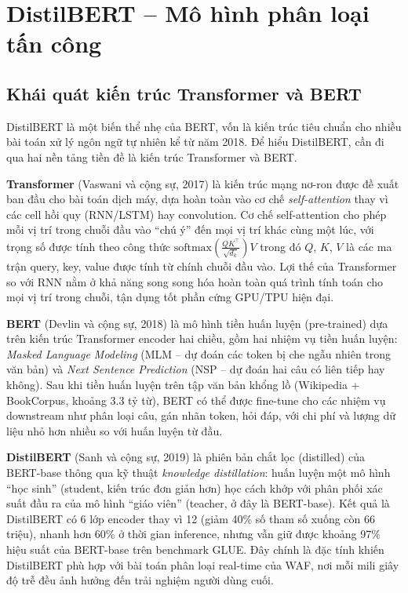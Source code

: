 \documentclass[../DoAn.tex]{subfiles}
\begin{document}
\section{DistilBERT -- Mô hình phân loại tấn công}
\label{section:3.3}

\subsection{Khái quát kiến trúc Transformer và BERT}
\label{subsection:3.3.1}

DistilBERT là một biến thể nhẹ của BERT, vốn là kiến trúc tiêu chuẩn cho
nhiều bài toán xử lý ngôn ngữ tự nhiên kể từ năm 2018. Để hiểu DistilBERT,
cần đi qua hai nền tảng tiền đề là kiến trúc Transformer và BERT.

\textbf{Transformer} (Vaswani và cộng sự, 2017) là kiến trúc mạng nơ-ron
được đề xuất ban đầu cho bài toán dịch máy, dựa hoàn toàn vào cơ chế
\textit{self-attention} thay vì các cell hồi quy (RNN/LSTM) hay convolution.
Cơ chế self-attention cho phép mỗi vị trí trong chuỗi đầu vào ``chú ý'' đến
mọi vị trí khác cùng một lúc, với trọng số được tính theo công thức
\(\text{softmax}\!\left(\frac{QK^\top}{\sqrt{d_k}}\right)V\) trong đó \(Q\),
\(K\), \(V\) là các ma trận query, key, value được tính từ chính chuỗi đầu
vào. Lợi thế của Transformer so với RNN nằm ở khả năng song song hóa hoàn
toàn quá trình tính toán cho mọi vị trí trong chuỗi, tận dụng tốt phần cứng
GPU/TPU hiện đại.

\textbf{BERT} (Devlin và cộng sự, 2018) là mô hình tiền huấn luyện
(pre-trained) dựa trên kiến trúc Transformer encoder hai chiều, gồm hai
nhiệm vụ tiền huấn luyện: \textit{Masked Language Modeling} (MLM -- dự đoán
các token bị che ngẫu nhiên trong văn bản) và \textit{Next Sentence
Prediction} (NSP -- dự đoán hai câu có liên tiếp hay không). Sau khi tiền
huấn luyện trên tập văn bản khổng lồ (Wikipedia + BookCorpus, khoảng 3.3 tỷ
từ), BERT có thể được fine-tune cho các nhiệm vụ downstream như phân loại
câu, gán nhãn token, hỏi đáp, với chi phí và lượng dữ liệu nhỏ hơn nhiều
so với huấn luyện từ đầu.

\textbf{DistilBERT} (Sanh và cộng sự, 2019) là phiên bản chắt lọc (distilled)
của BERT-base thông qua kỹ thuật \textit{knowledge distillation}: huấn
luyện một mô hình ``học sinh'' (student, kiến trúc đơn giản hơn) học cách
khớp với phân phối xác suất đầu ra của mô hình ``giáo viên'' (teacher, ở
đây là BERT-base). Kết quả là DistilBERT có 6 lớp encoder thay vì 12 (giảm
40\% số tham số xuống còn 66 triệu), nhanh hơn 60\% ở thời gian inference,
nhưng vẫn giữ được khoảng 97\% hiệu suất của BERT-base trên benchmark GLUE.
Đây chính là đặc tính khiến DistilBERT phù hợp với bài toán phân loại
real-time của WAF, nơi mỗi mili giây độ trễ đều ảnh hưởng đến trải nghiệm
người dùng cuối.
\end{document}
